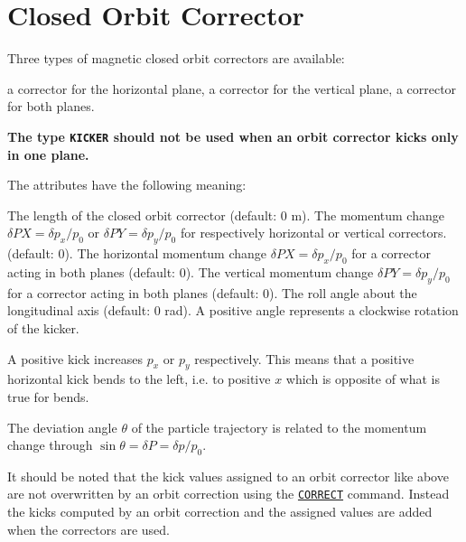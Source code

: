 \section{Closed Orbit Corrector}
\label{sec:closed-orbit-cor}\label{sec:kicker}

Three types of magnetic closed orbit correctors are available:
\begin{madlist}
    a corrector for the horizontal plane,
    a corrector for the vertical plane,
    a corrector for both planes.
\end{madlist}


\textbf{The type \texttt{KICKER} should not be used when an orbit corrector
  kicks only in one plane.}

The attributes have the following meaning:
\begin{madlist}
    The length of the closed orbit corrector (default: 0 m).
    The momentum change $\delta PX = \delta p_x/p_0$ or
     $\delta PY = \delta p_y / p_0$ for respectively horizontal or vertical
     correctors. (default: 0).
    The horizontal momentum change
     $\delta PX = \delta p_x/p_0$ for a corrector acting in both planes
     (default: 0).
    The vertical momentum change
     $\delta PY = \delta p_y/p_0$  for a corrector acting in both planes
     (default: 0).
    The roll angle about the longitudinal axis (default: 0
     rad). A positive angle represents a clockwise rotation of the
     kicker.
\end{madlist}

A positive kick increases $p_x$ or $p_y$ respectively. This
means that a positive horizontal kick bends to the left,  i.e. to
positive $x$ which is opposite of what is true for bends.

The deviation angle $\theta$ of the particle trajectory is related to
the momentum change through  $\sin \theta = \delta P = \delta p / p_0$.

It should be noted that the kick values assigned to an orbit corrector
like above are not overwritten by an orbit correction using the
\hyperref[sec:correct]{\texttt{CORRECT}}
command. Instead the kicks computed by an orbit correction and the
assigned values are added when the correctors are used.

